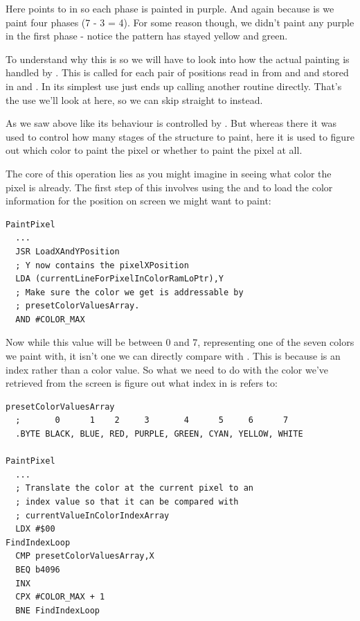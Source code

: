 Here  points to  in  so each phase is painted in purple. And again
because  is  we paint four phases (7 - 3 = 4). For some reason though, we
didn't paint any purple in the first phase - notice the pattern has stayed yellow and green.  


To understand why this is so we will have to look into how the actual painting is handled by . This is called for each pair of positions read
in from  and  and stored in  and .
In its simplest use  just ends up calling another routine  directly.
That's the use we'll look at here, so we can skip straight to  instead.

As we saw above like 
its behaviour is controlled by . But whereas there it was used to control how many
stages of the structure to paint, here it is used to figure out which color to paint the pixel or whether to paint the pixel 
at all.

The core of this operation lies as you might imagine in seeing what color the pixel is already. The first step of this involves
using the  and  to load the color information for the position on screen we might 
want to paint: 

\begin{lstlisting}
PaintPixel   
  ...
  JSR LoadXAndYPosition
  ; Y now contains the pixelXPosition
  LDA (currentLineForPixelInColorRamLoPtr),Y
  ; Make sure the color we get is addressable by
  ; presetColorValuesArray.
  AND #COLOR_MAX
\end{lstlisting}

Now while this value will be between 0 and 7, representing one of the seven colors we paint with, it isn't one we can directly
compare with . This is because  is an index rather
than a color value. So what we need to do with the color we've retrieved from the screen is figure out what index in 
 is refers to:

\begin{lstlisting}
presetColorValuesArray
  ;       0      1    2     3       4      5     6      7
  .BYTE BLACK, BLUE, RED, PURPLE, GREEN, CYAN, YELLOW, WHITE

PaintPixel   
  ...
  ; Translate the color at the current pixel to an
  ; index value so that it can be compared with
  ; currentValueInColorIndexArray
  LDX #$00
FindIndexLoop
  CMP presetColorValuesArray,X
  BEQ b4096
  INX 
  CPX #COLOR_MAX + 1
  BNE FindIndexLoop
\end{lstlisting}

